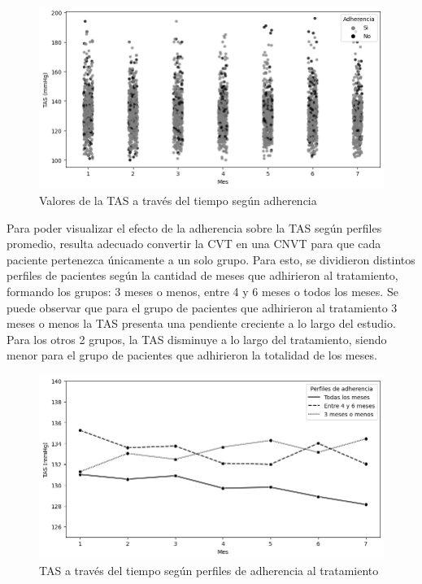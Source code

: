 \documentclass[spanish]{article}
\numberwithin{figure}{subsection}
\numberwithin{equation}{subsection}
\numberwithin{table}{subsection}
\begin{document}
\begin{figure}[H]
	\centering
	\includegraphics[scale=0.5]{img/TAS_vs_tpo_with_adherencia_scatter.png}
	\caption{Valores de la TAS a través del tiempo según adherencia}
	\label{TAS_with_adh_scatter}
\end{figure}

Para poder visualizar el efecto de la adherencia sobre la TAS según perfiles
promedio, resulta adecuado convertir la CVT en una CNVT para que cada paciente
pertenezca únicamente a un solo grupo. Para esto, se dividieron distintos
perfiles de pacientes según la cantidad de meses que adhirieron al tratamiento,
formando los grupos: 3 meses o menos, entre 4 y 6 meses o todos los meses. Se
puede observar que para el grupo de pacientes que adhirieron al tratamiento 3
meses o menos la TAS presenta una pendiente creciente a lo largo del estudio.
Para los otros 2 grupos, la TAS disminuye a lo largo del tratamiento, siendo
menor para el grupo de pacientes que adhirieron la totalidad de los meses.

\begin{figure}[H]
	\centering
	\includegraphics[scale=0.5]{img/TAS_vs_tpo_with_adherencia.png}
	\caption{TAS a través del tiempo según perfiles de adherencia al tratamiento}
	\label{TAS_with_adh}
\end{figure}
\end{document}
